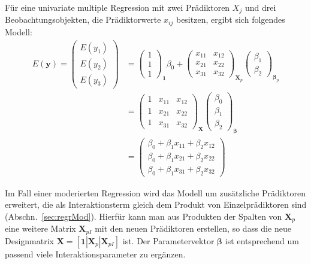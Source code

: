 Für eine univariate multiple Regression mit zwei Prädiktoren $X_{j}$ und drei Beobachtungsobjekten, die Prädiktorwerte $x_{ij}$ besitzen, ergibt sich folgendes Modell:
\begin{align*}
E(\bm{y}) =
 \left(\begin{array}{c} E(y_{1})\\ E(y_{2})\\ E(y_{3}) \end{array}\right) &= \left(\begin{array}{c} 1\\ 1\\ 1\end{array}\right)_{\bm{1}} \beta_{0} +
 \left(\begin{array}{cc}
 x_{11} & x_{12}\\
 x_{21} & x_{22}\\
 x_{31} & x_{32}
 \end{array}\right)_{\bm{X}_{p}}
 \left(\begin{array}{c} \beta_{1}\\ \beta_{2}\end{array}\right)_{\bm{\beta}_{p}} \\ &= \left(\begin{array}{ccc}1 & x_{11} & x_{12}\\ 1 & x_{21} & x_{22}\\ 1 & x_{31} & x_{32}\end{array}\right)_{\bm{X}} \left(\begin{array}{c} \beta_{0}\\ \beta_{1}\\ \beta_{2}\end{array}\right)_{\bm{\beta}}\\ &= \left(\begin{array}{c} \beta_{0} + \beta_{1} x_{11} + \beta_{2} x_{12}\\ \beta_{0} + \beta_{1} x_{21} + \beta_{2} x_{22}\\ \beta_{0} + \beta_{1} x_{31} + \beta_{2} x_{32}\end{array}\right)
\end{align*}

Im Fall einer moderierten Regression wird das Modell um zusätzliche Prädiktoren erweitert, die als Interaktionsterm gleich dem Produkt von Einzelprädiktoren sind (Abschn.\ \ref{sec:regrMod}). Hierfür kann man aus Produkten der Spalten von $\bm{X}_{p}$ eine weitere Matrix $\bm{X}_{pI}$ mit den neuen Prädiktoren erstellen, so dass die neue Designmatrix $\bm{X} = [\bm{1} | \bm{X}_{p} | \bm{X}_{pI}]$ ist. Der Parametervektor $\bm{\beta}$ ist entsprechend um passend viele Interaktionsparameter zu ergänzen.


